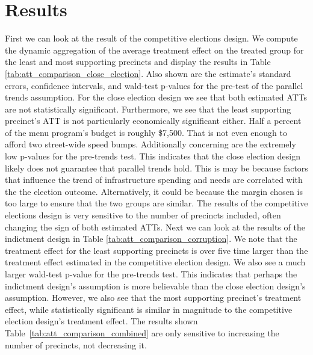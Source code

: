 \section{Results}\label{sec:results}

First we can look at the result of the competitive elections design.
We compute the dynamic aggregation of the average treatment effect on the treated group for the least and most supporting precincts and display the results in Table \ref{tab:att_comparison_close_election}.
Also shown are the estimate's standard errors, confidence intervals, and wald-test p-values for the pre-test of the parallel trends assumption.
For the close election design we see that both estimated ATTs are not statistically significant.
Furthermore, we see that the least supporting precinct's ATT is not particularly economically significant either. 
Half a percent of the menu program's budget is roughly \$7,500. 
That is not even enough to afford two street-wide speed bumps.
Additionally concerning are the extremely low p-values for the pre-trends test.
This indicates that the close election design likely does not guarantee that parallel trends hold.
This is may be because factors that influence the trend of infrastructure spending and needs are correlated with the the election outcome.
Alternatively, it could be because the margin chosen is too large to ensure that the two groups are similar.
The results of the competitive elections design is very sensitive to the number of precincts included, often changing the sign of both estimated ATTs.
Next we can look at the results of the indictment design in Table \ref{tab:att_comparison_corruption}.
We note that the treatment effect for the least supporting precincts is over five time larger than the treatment effect estimated in the competitive election design.
We also see a much larger wald-test p-value for the pre-trends test.
This indicates that perhaps the indictment design's assumption is more believable than the close election design's assumption.
However, we also see that the most supporting precinct's treatment effect, while statistically significant is similar in magnitude to the competitive election design's treatment effect.
The results shown Table~\ref{tab:att_comparison_combined} are only sensitive to increasing the number of precincts, not decreasing it. 


